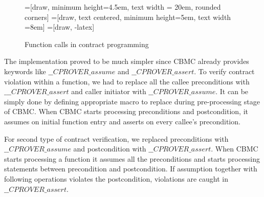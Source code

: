 \begin{figure}
    \centering
    =[draw, minimum height=4.5em, text width = 20em, rounded corners]
    =[draw, text centered, minimum height=5em, text width =8em]
    =[draw, -latex]
   \caption{Function calls in contract programming }
   \label{fig:impl:contract:funcall}

\end{figure}

The implementation proved to be much simpler since CBMC already provides keywords like $\_\_CPROVER\_assume$ and $\_\_CPROVER\_assert$. To verify contract violation within a function, we had to replace all the callee preconditions with $\_\_\_CPROVER\_assert$ and caller initiator with $\_\_CPROVER\_assume$. It can be simply done by defining appropriate macro to replace during pre-processing stage of CBMC. When CBMC starts processing preconditions and postcondition, it assumes on initial function entry and asserts on every callee's precondition.

For second type of contract verification, we replaced preconditions with $\_\_CPROVER\_assume$ and postcondition with $\_\_CPROVER\_assert$. When CBMC starts processing a function it assumes all the preconditions and starts processing statements between precondition and postcondition. If assumption together with following operations violates the postcondition, violations are caught in $\_\_CPROVER\_assert$.


